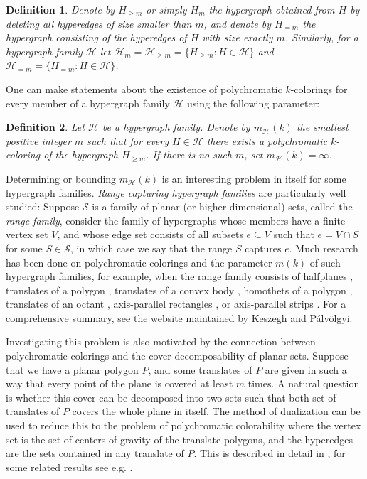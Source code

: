 \documentclass[11pt,oneside]{amsart}
\newcommand{\HH}{\mathcal{H}}
\newtheorem{definition}{Definition}
\begin{document}
\begin{definition} Denote by $H_{\ge m}$ or simply $H_m$ the hypergraph obtained from $H$ by deleting all hyperedges of size smaller than $m$, and denote by $H_{=m}$ the hypergraph consisting of the hyperedges of $H$ with size exactly $m$. Similarly, for a hypergraph family $\mathcal{H}$ let $\HH_m=\HH_{\ge m}=\{H_{\ge m}:H\in\HH\}$ and $\HH_{=m}=\{H_{=m}:H\in\HH\}$.
\end{definition}

One can make statements about the existence of polychromatic $k$-colorings for every member of a hypergraph family $\HH$ using the following parameter:

\begin{definition} Let $\mathcal{H}$ be a hypergraph family. Denote by $m_\mathcal{H}(k)$ the smallest positive integer $m$ such that for every $H\in\mathcal{H}$ there exists a polychromatic $k$-coloring of the hypergraph $H_{\ge m}$. If there is no such $m$, set $m_{\mathcal{H}}(k)=\infty$.
\end{definition}

Determining or bounding $m_{\mathcal{H}}(k)$ is an interesting problem in itself for some hypergraph families. {\it Range capturing hypergraph families} are particularly well studied: Suppose $\mathcal{S}$ is a family of planar (or higher dimensional) sets, called the {\it range family}, consider the family of hypergraphs whose members have a finite vertex set $V$, and whose edge set consists of all subsets $e\subseteq V$ such that $e=V\cap S$ for some $S\in\mathcal{S}$, in which case we say that the range $S$ captures $e$. Much research has been done on polychromatic colorings and the parameter $m(k)$ of such hypergraph families, for example, when the range family consists of halfplanes \cite{felsik}, translates of a polygon \cite{varadarajan}, translates of a convex body \cite{damasdi2021three}, homothets of a polygon \cite{damasdi2022realizing}, translates of an octant \cite{ternyolcad}, axis-parallel rectangles \cite{teglalap}, or axis-parallel strips \cite{apstrip}. For a comprehensive summary, see the website \cite{cogezoo} maintained by Keszegh and Pálvölgyi.

Investigating this problem is also motivated by the connection between polychromatic colorings and the cover-decomposability of planar sets. Suppose that we have a planar polygon $P$, and some translates of $P$ are given in such a way that every point of the plane is covered at least $m$ times. A natural question is whether this cover can be decomposed into two sets such that both set of translates of $P$ covers the whole plane in itself. The method of dualization can be used to reduce this to the problem of polychromatic colorability where the vertex set is the set of centers of gravity of the translate polygons, and the hyperedges are the sets contained in any translate of $P$. This is described in detail in \cite{dekompozicio}, for some related results see e.g. \cite{pach2016unsplittable, palvolgyi2010convex, palvolgyi2010indecomposable, varadarajan, keszegh2012octants, kovacs2015indecomposable}.
\end{document}
